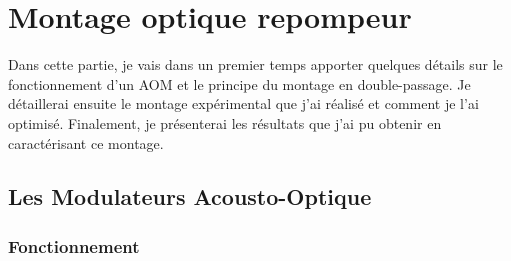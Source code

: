 \documentclass[12pt, a4paper]{article}
\begin{document}
\section{Montage optique repompeur}\label{sec:opticsetup}

Dans cette partie, je vais dans un premier temps apporter quelques détails sur le fonctionnement d'un AOM et le principe du montage en double-passage. Je détaillerai ensuite le montage expérimental que j'ai réalisé et comment je l'ai optimisé. Finalement, je présenterai les résultats que j'ai pu obtenir en caractérisant ce montage. 

\subsection{Les Modulateurs Acousto-Optique}\label{subsec:AOM}

\subsubsection{Fonctionnement}\label{subsubsec:AOMth}
\end{document}
